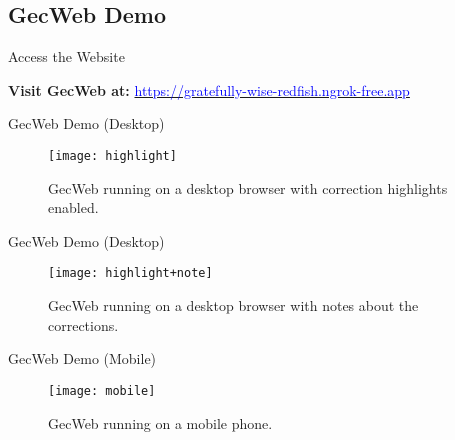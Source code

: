 \subsection{GecWeb Demo}

\begin{frame}{Access the Website}
  \centering

  {
    \Large \textbf{Visit GecWeb at:}
    \href{https://gratefully-wise-redfish.ngrok-free.app}{\textcolor{blue}{https://gratefully-wise-redfish.ngrok-free.app}}
  }

  \vspace{1cm}


\end{frame}


\begin{frame}{GecWeb Demo (Desktop)}
  \begin{figure}
    \texttt{[image: highlight]}
    \caption{GecWeb running on a desktop browser with correction highlights enabled.}
  \end{figure}
\end{frame}

\begin{frame}{GecWeb Demo (Desktop)}
  \begin{figure}
    \texttt{[image: highlight+note]}
    \caption{GecWeb running on a desktop browser with notes about the corrections.}
  \end{figure}
\end{frame}

\begin{frame}{GecWeb Demo (Mobile)}
  \begin{figure}
    \texttt{[image: mobile]}
    \caption{GecWeb running on a mobile phone.}
  \end{figure}
\end{frame}
